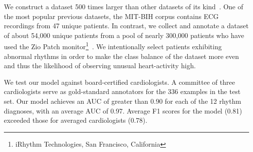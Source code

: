 We construct a dataset 500 times larger than other datasets of its
kind~\cite{moody2001impact, goldberger2000physiobank}. One of the most popular
previous datasets, the MIT-BIH corpus contains ECG recordings from 47 unique
patients. In contrast, we collect and annotate a dataset of about 54,000 unique
patients from a pool of nearly 300,000 patients who have used the Zio Patch
monitor\footnote[1]{iRhythm Technologies, San Francisco,
California}~\cite{turakhia2013diagnostic}. We intentionally select patients
exhibiting abnormal rhythms in order to make the class balance of the dataset
more even and thus the likelihood of observing unusual heart-activity high.

We test our model against board-certified cardiologists. A committee of three
cardiologists serve as gold-standard annotators for the 336 examples in the
test set. Our model achieves an AUC of greater than 0.90 for each of the 12
rhythm diagnoses, with an average AUC of 0.97. Average F1 scores for the model
(0.81) exceeded those for averaged cardiologists (0.78).
